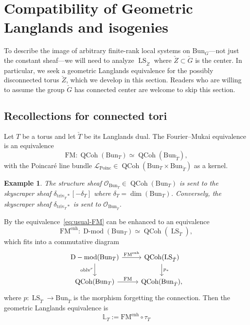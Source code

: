 \documentclass[11pt]{amsart}
\newcommand{\cL}{{\mathcal L}}
\newcommand{\cO}{{\mathcal O}}
\newcommand{\triv}{\mathrm{triv}}
\newcommand{\Bun}{{\mathrm{Bun}}}
\newcommand{\Poinc}{\operatorname{Poinc}}
\newcommand{\oblv}{\operatorname{oblv}}
\DeclareMathOperator{\QCoh}{QCoh}
\DeclareMathOperator{\Dmod}{D-mod}
\DeclareMathOperator{\LS}{LS}
\newtheorem{example}[thm]{Example}
\theoremstyle{remark}
\theoremstyle{definition}
\begin{document}
\section{Compatibility of Geometric Langlands and isogenies}\label{sec:compatibility-of-geometric-langlands-and-isogenies}
To describe the image of arbitrary finite-rank local systems on $\Bun_G$---not just the constant sheaf---we will need to analyze $\LS_{\check Z}$ where $\check Z\subset\check G$ is the center. In particular, we seek a geometric Langlands equivalence for the possibly disconnected torus $\check Z$, which we develop in this section. Readers who are willing to assume the group $\check G$ has connected center are welcome to skip this section.
\subsection{Recollections for connected tori}
Let $T$ be a torus and let $\check T$ be its Langlands dual. The Fourier--Mukai equivalence is an equivalence
\begin{equation}\label{eq:usual-FM}
\mathrm{FM}\colon\QCoh(\Bun_T)\simeq\QCoh(\Bun_{\check T}),
\end{equation}
with the Poincar\'e line bundle $\cL_{\Poinc}\in\QCoh(\Bun_T\times\Bun_{\check T})$ as a kernel. 
\begin{example}\label{example:image-under-FM}
    The structure sheaf $\cO_{\Bun_T}\in\QCoh(\Bun_T)$ is sent to the skyscraper sheaf $\delta_{\triv_{\check T}*}[-\delta_T]$ where $\delta_T=\dim(\Bun_T)$. Conversely, the skyscraper sheaf $\delta_{\triv_T*}$ is sent to $\cO_{\Bun_{\check T}}$.
\end{example}
By \cite{laumon-fourier,rothstein} the equivalence~\eqref{eq:usual-FM} can be enhanced to an equivalence
\begin{equation}\label{eq:FM-enhanced}
\mathrm{FM}^{\mathrm{enh}}\colon\Dmod(\Bun_T)\simeq\QCoh(\LS_{\check T}),
\end{equation}
which fits into a commutative diagram \cite[\S1.5.2]{GLC1}
\[
\begin{tikzcd}
    \Dmod(\Bun_T)\arrow{r}{\mathrm{FM}^{\mathrm{enh}}}\arrow[swap]{d}{\oblv^r}&\QCoh(\LS_{\check T})\arrow{d}{p_*}\\
    \QCoh(\Bun_T)\arrow{r}{\mathrm{FM}}&\QCoh(\Bun_{\check T}),
\end{tikzcd}
\]
where $p\colon\LS_{\check T}\to\Bun_{\check T}$ is the morphism forgetting the connection. Then the geometric Langlands equivalence is
\begin{equation}\label{eq:GLC-tori-defn}
\mathbb L_T:=\mathrm{FM}^{\mathrm{enh}}\circ\tau_T
\end{equation}
\end{document}
